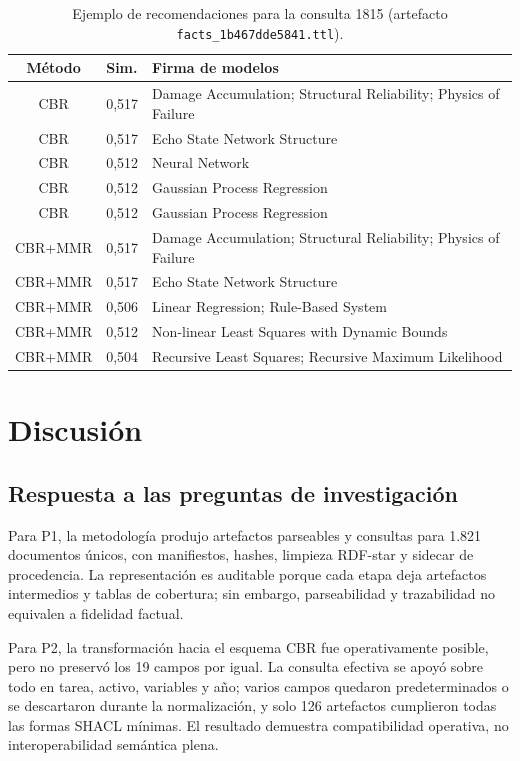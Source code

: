 \documentclass[11pt,a4paper]{article}
\begin{document}
\begin{table}[H]
\centering
\caption{Ejemplo de recomendaciones para la consulta 1815 (artefacto \texttt{facts\_1b467dde5841.ttl}).}
\label{tab:example}
\footnotesize
\begin{tabularx}{\linewidth}{clX}
\toprule
Método & Sim. & Firma de modelos \\
\midrule
CBR & 0,517 & Damage Accumulation; Structural Reliability; Physics of Failure \\
CBR & 0,517 & Echo State Network Structure \\
CBR & 0,512 & Neural Network \\
CBR & 0,512 & Gaussian Process Regression \\
CBR & 0,512 & Gaussian Process Regression \\
\midrule
CBR+MMR & 0,517 & Damage Accumulation; Structural Reliability; Physics of Failure \\
CBR+MMR & 0,517 & Echo State Network Structure \\
CBR+MMR & 0,506 & Linear Regression; Rule-Based System \\
CBR+MMR & 0,512 & Non-linear Least Squares with Dynamic Bounds \\
CBR+MMR & 0,504 & Recursive Least Squares; Recursive Maximum Likelihood \\
\bottomrule
\end{tabularx}
\end{table}

\section{Discusión}
\label{sec:discussion}

\subsection{Respuesta a las preguntas de investigación}

Para P1, la metodología produjo artefactos parseables y consultas para 1.821 documentos únicos, con manifiestos, hashes, limpieza RDF-star y sidecar de procedencia. La representación es auditable porque cada etapa deja artefactos intermedios y tablas de cobertura; sin embargo, parseabilidad y trazabilidad no equivalen a fidelidad factual.

Para P2, la transformación hacia el esquema CBR fue operativamente posible, pero no preservó los 19 campos por igual. La consulta efectiva se apoyó sobre todo en tarea, activo, variables y año; varios campos quedaron predeterminados o se descartaron durante la normalización, y solo 126 artefactos cumplieron todas las formas SHACL mínimas. El resultado demuestra compatibilidad operativa, no interoperabilidad semántica plena.
\end{document}
